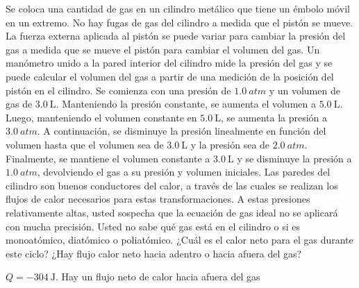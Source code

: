 %
\begin{Exercise}
  Se coloca una cantidad de gas en un cilindro metálico que tiene un émbolo móvil en un extremo. No hay fugas de gas del cilindro a medida que el pistón se mueve. La fuerza externa aplicada al pistón se puede variar para cambiar la presión del gas a medida que se mueve el pistón para cambiar el volumen del gas. Un manómetro unido a la pared interior del cilindro mide la presión del gas y se puede calcular el volumen del gas a partir de una medición de la posición del pistón en el cilindro. Se comienza con una presión de $\SI{1.0}{atm}$ y un volumen de gas de $\SI{3.0}{\liter}$. Manteniendo la  presión constante, se aumenta el volumen a $\SI{5.0}{\liter}$. Luego, manteniendo el volumen constante en $\SI{5.0}{\liter}$, se aumenta la presión a $\SI{3.0}{atm}$. A continuación, se disminuye la presión linealmente en función del volumen hasta que el volumen sea de $\SI{3.0}{\liter}$ y la presión sea de $\SI{2.0}{atm}$. Finalmente, se mantiene el volumen constante a $\SI{3.0}{\liter}$ y se disminuye la presión a $\SI{1.0}{atm}$, devolviendo el gas a su presión y volumen iniciales. Las paredes del cilindro son buenos conductores del calor, a través de las cuales se realizan los flujos de calor necesarios para estas transformaciones. A estas presiones relativamente altas, usted sospecha que la ecuación de gas ideal no se aplicará con mucha precisión. Usted no sabe qué gas está en el cilindro o si es monoatómico, diatómico o poliatómico. ¿Cuál es el calor neto para el gas durante este ciclo? ¿Hay flujo calor neto hacia adentro o hacia afuera del gas?
\end{Exercise}
\begin{Answer}
  \begin{minipage}[t]{.4\textwidth}
    $Q = \SI{-304}{\joule}$. Hay un flujo neto de calor hacia afuera del gas
  \end{minipage}
\end{Answer}
